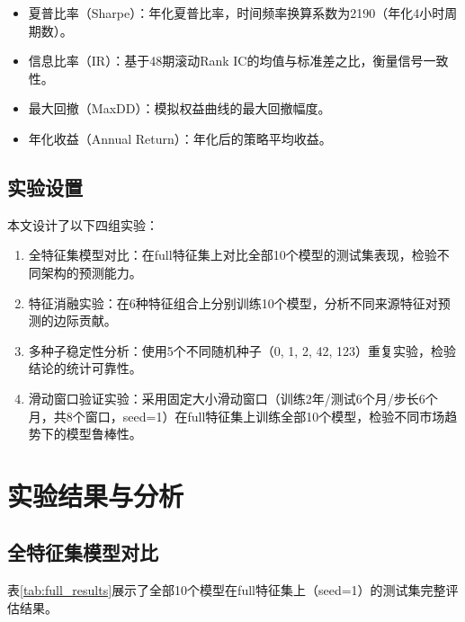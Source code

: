 \documentclass[12pt,a4paper]{ctexart}
\begin{document}
\begin{itemize}[leftmargin=2.5em]
    \item 夏普比率（Sharpe）：年化夏普比率，时间频率换算系数为2190（年化4小时周期数）。
    \item 信息比率（IR）：基于48期滚动Rank IC的均值与标准差之比，衡量信号一致性\cite{grinold2000}。
    \item 最大回撤（MaxDD）：模拟权益曲线的最大回撤幅度。
    \item 年化收益（Annual Return）：年化后的策略平均收益。
\end{itemize}

\subsection{实验设置}

本文设计了以下四组实验：

\begin{enumerate}[label={实验\arabic*：},leftmargin=2.5em]
    \item 全特征集模型对比：在full特征集上对比全部10个模型的测试集表现，检验不同架构的预测能力。
    \item 特征消融实验：在6种特征组合上分别训练10个模型，分析不同来源特征对预测的边际贡献。
    \item 多种子稳定性分析：使用5个不同随机种子（0, 1, 2, 42, 123）重复实验，检验结论的统计可靠性。
    \item 滑动窗口验证实验：采用固定大小滑动窗口（训练2年/测试6个月/步长6个月，共8个窗口，seed=1）在full特征集上训练全部10个模型，检验不同市场趋势下的模型鲁棒性。
\end{enumerate}

\section{实验结果与分析}

\subsection{全特征集模型对比}

表\ref{tab:full_results}展示了全部10个模型在full特征集上（seed=1）的测试集完整评估结果。
\end{document}
